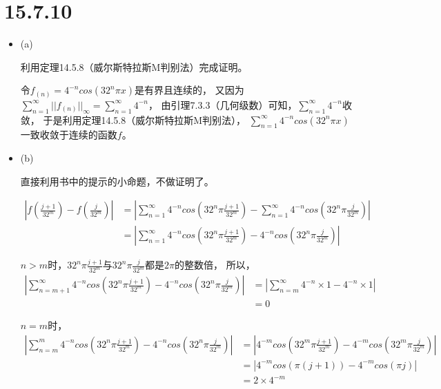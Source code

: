 \documentclass{article}
\begin{document}
\section*{15.7.10}

\begin{itemize}
  \item (a)

        利用定理14.5.8（威尔斯特拉斯M判别法）完成证明。

        令$f_(n) = 4^{-n} cos(32^n \pi x)$是有界且连续的，
        又因为$\sum \limits_{n = 1}^{\infty} ||f_(n)||_{\infty} = \sum \limits_{n = 1}^{\infty} 4^{-n}$，
        由引理7.3.3（几何级数）可知，$\sum \limits_{n = 1}^{\infty} 4^{-n}$收敛，
        于是利用定理14.5.8（威尔斯特拉斯M判别法），
        $\sum \limits_{n = 1}^{\infty} 4^{-n} cos(32^n \pi x)$
        一致收敛于连续的函数$f$。
  \item (b)

        直接利用书中的提示的小命题，不做证明了。

        \begin{align*}
          \left|f(\frac{j + 1}{32^m}) - f(\frac{j}{32^m})\right|
           & = \left|\sum\limits_{n = 1}^{\infty} 4^{-n} cos(32^n \pi \frac{j + 1}{32^m}) - \sum\limits_{n = 1}^{\infty} 4^{-n} cos(32^n \pi \frac{j}{32^m}) \right| \\
           & =  \left|\sum\limits_{n = 1}^{\infty} 4^{-n} cos(32^n \pi \frac{j + 1}{32^m}) - 4^{-n} cos(32^n \pi \frac{j}{32^m}) \right|
        \end{align*}

        $n > m$时，$32^n \pi \frac{j + 1}{32^m}$与$32^n \pi \frac{j}{32^m}$都是$2\pi$的整数倍，
        所以，
        \begin{align*}
          \left|\sum\limits_{n = m+1}^{\infty} 4^{-n} cos(32^n \pi \frac{j + 1}{32^m}) - 4^{-n} cos(32^n \pi \frac{j}{32^m}) \right|
           & = \left|\sum\limits_{n = m}^{\infty} 4^{-n} \times 1  - 4^{-n} \times 1  \right| \\
           & = 0
        \end{align*}

        $n = m$时，
        \begin{align*}
          \left|\sum\limits_{n = m}^{m} 4^{-n} cos(32^n \pi \frac{j + 1}{32^m}) - 4^{-n} cos(32^n \pi \frac{j}{32^m}) \right|
           & = \left|4^{-m} cos(32^m \pi \frac{j + 1}{32^m}) - 4^{-m} cos(32^m \pi \frac{j}{32^m}) \right| \\
           & = \left|4^{-m} cos(\pi (j + 1)) - 4^{-m} cos(\pi j) \right|                                   \\
           & = 2 \times 4^{-m}
        \end{align*}


\end{itemize}
\end{document}
